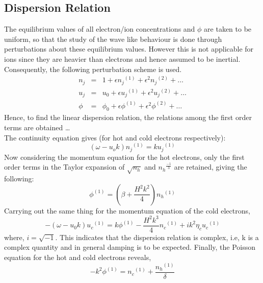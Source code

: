 \documentclass[a4paper, 12pt]{article}
\begin{document}
\subsection{Dispersion Relation}
The equilibrium values of all electron/ion concentrations and $\phi$ are taken to be uniform, so that the study of the wave like behaviour is done through perturbations about these equilibrium values. However this is not applicable for ions since they are heavier than electrons and hence assumed to be inertial.
Consequently, the following perturbation scheme is used.
\begin{eqnarray}
    n_j &=& 1 + \epsilon {n_j}^{(1)} + \epsilon^2 {n_j}^{(2)} + \dots \\
    u_j &=& u_0 + \epsilon {u_j}^{(1)} + \epsilon^2 {u_j}^{(2)} + \dots \\
    \phi &=& \phi_0 + \epsilon \phi^{(1)} + \epsilon^2 \phi^{(2)} + \dots
\end{eqnarray}
Hence, to find the linear dispersion relation, the relations among the first order terms are obtained \dots\\
The continuity equation gives (for hot and cold electrons respectively):
\begin{equation}
    (\omega - u_o k) {n_j}^{(1)} = k {u_j}^{(1)}    
\end{equation}
Now considering the momentum equation for the hot electrons, only the first order terms in the Taylor expansion of $\sqrt{n_h}$ and ${n_h}^{\frac{-1}{3}}$ are retained, giving the following:
\begin{equation}
    \phi^{(1)} = (\beta + \frac{H^2 k^2}{4}){n_h}^{(1)}    
\end{equation}
Carrying out the same thing for the momentum equation of the cold electrons,
\begin{equation}
    -(\omega - u_0 k){u_c}^{(1)} = k \phi^{(1)} - \frac{H^2 k^3}{4}{n_c}^{(1)} + ik^2 \eta_c {u_c}^{(1)}    
\end{equation}
where, $i = \sqrt{-1}$. This indicates that the dispersion relation is complex, i.e, k is a complex quantity and in general damping is to be expected.
Finally, the Poisson equation for the hot and cold electrons reveals,
\begin{equation}
    -k^2 \phi^{(1)} = {n_c}^{(1)} + \frac{{n_h}^{(1)}}{\delta}
\end{equation}
\end{document}
